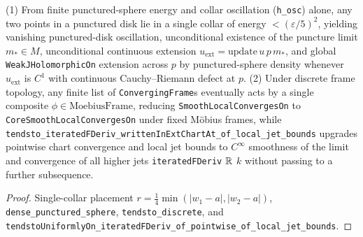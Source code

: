 \begin{theorem}
\label{n3_phase1_punc_aa}
\leanok
{}
(1) From finite punctured-sphere energy and collar oscillation (\texttt{h\_osc}) alone, any two points in
a punctured disk lie in a single collar of energy $<(\varepsilon/5)^2$, yielding vanishing punctured-disk
oscillation, unconditional existence of the puncture limit $m_*\in M$, unconditional continuous extension
$u_{\mathrm{ext}}=\mathrm{update}\,u\,p\,m_*$, and global \texttt{WeakJHolomorphicOn} extension across $p$
by punctured-sphere density whenever $u_{\mathrm{ext}}$ is $C^1$ with continuous Cauchy--Riemann defect at $p$.
(2) Under discrete frame topology, any finite list of \texttt{ConvergingFrame}s eventually acts by a single
composite $\phi\in\mathrm{MoebiusFrame}$, reducing \texttt{SmoothLocalConvergesOn} to
\texttt{CoreSmoothLocalConvergesOn} under fixed Möbius frames, while
\texttt{tendsto\_iteratedFDeriv\_writtenInExtChartAt\_of\_local\_jet\_bounds} upgrades pointwise chart
convergence and local jet bounds to $C^\infty$ smoothness of the limit and convergence of all higher jets
\texttt{iteratedFDeriv} $\mathbb{R}$ $k$ without passing to a further subsequence.
\end{theorem}
\begin{proof}\leanok Single-collar placement $r=\tfrac14\min(|w_1-a|,|w_2-a|)$,
\texttt{dense\_punctured\_sphere}, \texttt{tendsto\_discrete}, and
\texttt{tendstoUniformlyOn\_iteratedFDeriv\_of\_pointwise\_of\_local\_jet\_bounds}.\end{proof}

